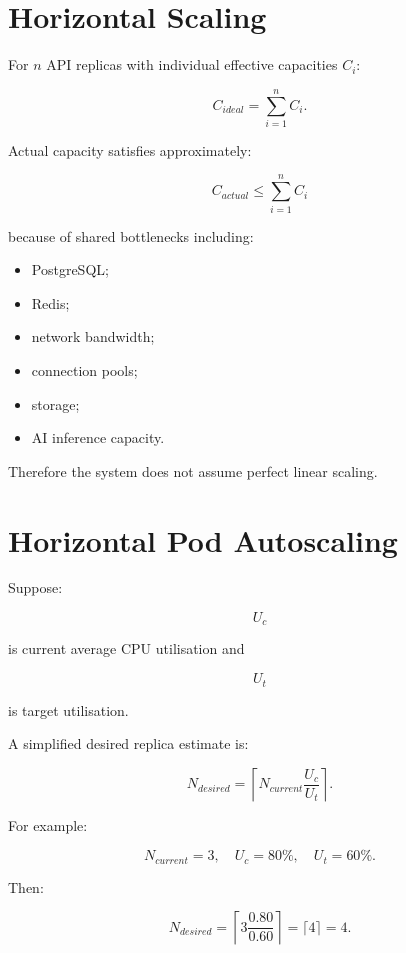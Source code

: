 \documentclass[11pt,a4paper]{article}
\begin{document}
\section{Horizontal Scaling}

For \(n\) API replicas with individual effective capacities \(C_i\):

\[
C_{ideal}
=
\sum_{i=1}^{n}C_i.
\]

Actual capacity satisfies approximately:

\[
C_{actual}
\leq
\sum_{i=1}^{n}C_i
\]

because of shared bottlenecks including:

\begin{itemize}
    \item PostgreSQL;
    \item Redis;
    \item network bandwidth;
    \item connection pools;
    \item storage;
    \item AI inference capacity.
\end{itemize}

Therefore the system does not assume perfect linear scaling.

\section{Horizontal Pod Autoscaling}

Suppose:

\[
U_c
\]

is current average CPU utilisation and

\[
U_t
\]

is target utilisation.

A simplified desired replica estimate is:

\[
N_{desired}
=
\left\lceil
N_{current}
\frac{U_c}{U_t}
\right\rceil.
\]

For example:

\[
N_{current}=3,
\quad
U_c=80\%,
\quad
U_t=60\%.
\]

Then:

\[
N_{desired}
=
\left\lceil
3
\frac{0.80}{0.60}
\right\rceil
=
\lceil4\rceil
=
4.
\]
\end{document}
